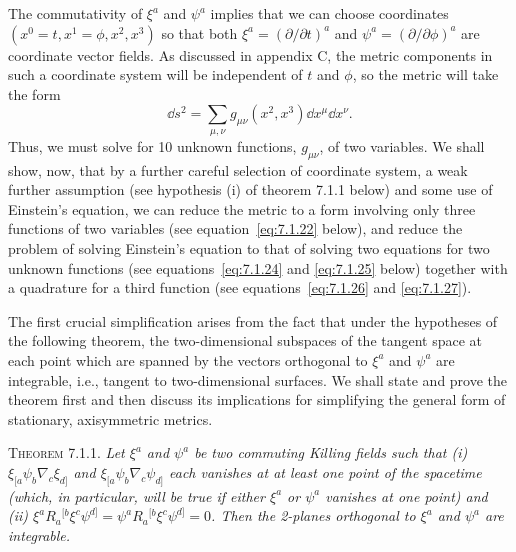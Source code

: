 The commutativity of \(\xi^a\) and \(\psi^a\) implies that we can choose coordinates
\((x^0=t,x^1=\phi,x^2,x^3)\) so that both
\(\xi^a=(\partial/\partial t)^a\) and
\(\psi^a=(\partial/\partial\phi)^a\) are coordinate vector fields. As discussed in
appendix C, the metric components in such a coordinate system will be independent
of \(t\) and \(\phi\), so the metric will take the form
\begin{equation}
  \dd s^2=\sum_{\mu,\nu}g_{\mu\nu}(x^2,x^3)\dd x^\mu\dd x^\nu .
  \tag{7.1.3}\label{eq:7.1.3}
\end{equation}
Thus, we must solve for 10 unknown functions, \(g_{\mu\nu}\), of two variables. We
shall show, now, that by a further careful selection of coordinate system, a weak
further assumption (see hypothesis (i) of theorem 7.1.1 below) and some use of
Einstein's equation, we can reduce the metric to a form involving only three
functions of two variables (see equation~\eqref{eq:7.1.22} below), and reduce the
problem of solving Einstein's equation to that of solving two equations for two
unknown functions (see equations~\eqref{eq:7.1.24} and \eqref{eq:7.1.25} below)
together with a quadrature for a third function (see equations~\eqref{eq:7.1.26} and
\eqref{eq:7.1.27}).

The first crucial simplification arises from the fact that under the hypotheses of the
following theorem, the two-dimensional subspaces of the tangent space at each point
which are spanned by the vectors orthogonal to \(\xi^a\) and \(\psi^a\) are
integrable, i.e., tangent to two-dimensional surfaces. We shall state and prove the
theorem first and then discuss its implications for simplifying the general form of
stationary, axisymmetric metrics.

\medskip
\noindent\textsc{Theorem 7.1.1.}\label{thm:7.1.1}\quad
\emph{Let \(\xi^a\) and \(\psi^a\) be two commuting Killing fields such that
(i) \(\xi_{[a}\psi_b\nabla_c\xi_{d]}\) and
\(\xi_{[a}\psi_b\nabla_c\psi_{d]}\) each vanishes at at least one point of the
spacetime (which, in particular, will be true if either \(\xi^a\) or \(\psi^a\)
vanishes at one point) and
(ii) \(\xi^aR_a{}^{[b}\xi^c\psi^{d]}=\psi^aR_a{}^{[b}\xi^c\psi^{d]}=0\).
Then the 2-planes orthogonal to \(\xi^a\) and \(\psi^a\) are integrable.}

